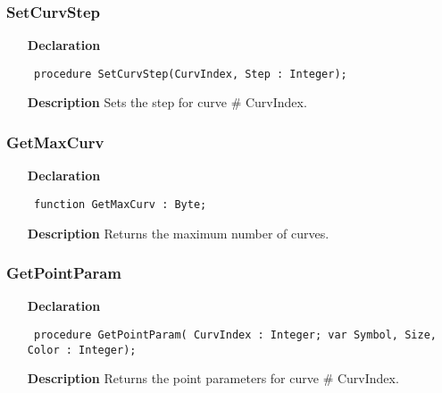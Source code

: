 \documentclass[12pt,a4paper,oneside]{report}
\newcommand{\declarationitem}[1]{\textbf{#1}}
\newcommand{\descriptiontitle}[1]{\textbf{#1}}
\newcommand{\code}[1]{\texttt{#1}}
\begin{document}
\subsubsection{SetCurvStep}
\label{uplot-SetCurvStep}
\begin{itemize}\item[\declarationitem{Declaration}\hfill]
	\begin{flushleft}
		\code{
			procedure SetCurvStep(CurvIndex, Step : Integer);}
		
	\end{flushleft}
	
	\par
	\item[\descriptiontitle{Description}]
	Sets the step for curve {\#} CurvIndex.
	
\end{itemize}
\subsubsection{GetMaxCurv}
\label{uplot-GetMaxCurv}
\begin{itemize}\item[\declarationitem{Declaration}\hfill]
	\begin{flushleft}
		\code{
			function GetMaxCurv : Byte;}
		
	\end{flushleft}
	
	\par
	\item[\descriptiontitle{Description}]
	Returns the maximum number of curves.
	
\end{itemize}
\subsubsection{GetPointParam}
\label{uplot-GetPointParam}
\begin{itemize}\item[\declarationitem{Declaration}\hfill]
	\begin{flushleft}
		\code{
			procedure GetPointParam( CurvIndex : Integer; var Symbol, Size, Color : Integer);}
		
	\end{flushleft}
	
	\par
	\item[\descriptiontitle{Description}]
	Returns the point parameters for curve {\#} CurvIndex.
	
\end{itemize}
\end{document}
